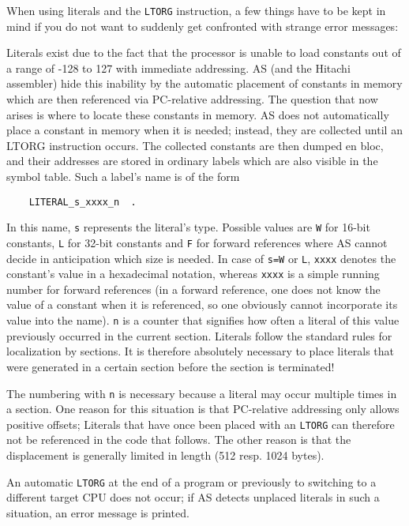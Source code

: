\documentclass[12pt,twoside]{report}
\newcommand{\tty}[1]{{\tt #1}}
\newcommand{\asname}{{AS}}
\begin{document}
When using literals and the \tty{LTORG} instruction, a few things have to
be kept in mind if you do not want to suddenly get confronted with strange
error messages:

Literals exist due to the fact that the processor is unable to load
constants out of a range of -128 to 127 with immediate addressing.
\asname{} (and the Hitachi assembler) hide this inability by the automatic
placement of constants in memory which are then referenced via
PC-relative addressing.  The question that now arises is where to
locate these constants in memory.  \asname{} does not automatically place a
constant in memory when it is needed; instead, they are collected
until an LTORG instruction occurs.  The collected constants are then
dumped en bloc, and their addresses are stored in ordinary labels
which are also visible in the symbol table.  Such a label's name is
of the form
\begin{verbatim}
    LITERAL_s_xxxx_n  .
\end{verbatim}
In this name, \tty{s} represents the literal's type.  Possible values are
\tty{W} for 16-bit constants, \tty{L} for 32-bit constants and \tty{F} for
forward references where \asname{} cannot decide in anticipation which size is
needed.  In case of \tty{s=W} or \tty{L}, \tty{xxxx} denotes the
constant's value in a hexadecimal notation, whereas \tty{xxxx} is a simple
running number for forward references (in a forward reference, one does
not know the value of a constant when it is referenced, so one obviously
cannot incorporate its value into the name).  \tty{n} is a counter that
signifies how often a literal of this value previously occurred in the
current section.  Literals follow the standard rules for localization by
sections.  It is therefore absolutely necessary to place literals that
were generated in a certain section before the section is terminated!

The numbering with \tty{n} is necessary because a literal may occur
multiple times in a section.  One reason for this situation is that
PC-relative addressing only allows positive offsets; Literals that
have once been placed with an \tty{LTORG} can therefore not be referenced
in the code that follows.  The other reason is that the displacement
is generally limited in length (512 resp. 1024 bytes).

An automatic \tty{LTORG} at the end of a program or previously to
switching to a different target CPU does not occur; if \asname{} detects unplaced
literals in such a situation, an error message is printed.
\end{document}
